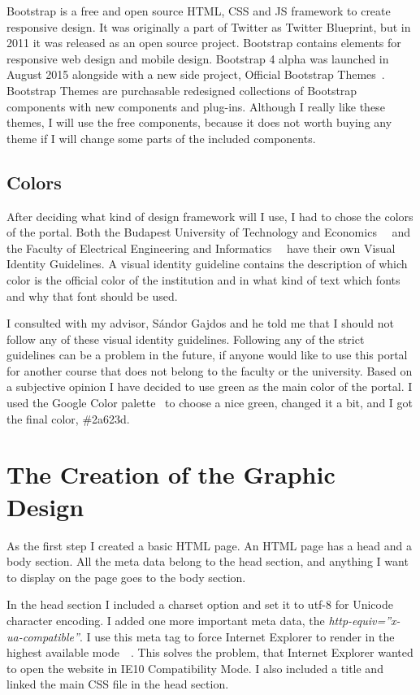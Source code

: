 Bootstrap is a free and open source HTML, CSS and JS framework to create responsive design. It was originally a part of Twitter as Twitter Blueprint, but in 2011 it was released as an open source project. Bootstrap contains elements for responsive web design and mobile design. Bootstrap 4 alpha was launched in August 2015 alongside with a new side project, Official Bootstrap Themes~\cite{Bootstrap-themes}. Bootstrap Themes are purchasable redesigned collections of Bootstrap components with new components and plug-ins. Although I really like these themes, I will use the free components, because it does not worth buying any theme if I will change some parts of the included components. 

\subsection{Colors}

After deciding what kind of design framework will I use, I had to chose the colors of the portal. Both the Budapest University of Technology and Economics~\cite{BME-Arculat}~\cite{BME-Arculat-Intranet} and the Faculty of Electrical Engineering and Informatics~\cite{VIK-Arculat}~\cite{VIK-Arculat-PDF} have their own Visual Identity Guidelines. A visual identity guideline contains the description of which color is the official color of the institution and in what kind of text which fonts and why that font should be used.

I consulted with my advisor, Sándor Gajdos and he told me that I should not follow any of these visual identity guidelines. Following any of the strict guidelines can be a problem in the future, if anyone would like to use this portal for another course that does not belong to the faculty or the university. Based on a subjective opinion I have decided to use green as the main color of the portal. I used the Google Color palette~\cite{google-color-chart} to choose a nice green, changed it a bit, and I got the final color, \#2a623d.

\section{The Creation of the Graphic Design}

As the first step I created a basic HTML page. An HTML page has a head and a body section. All the meta data belong to the head section, and anything I want to display on the page goes to the body section. 

In the head section I included a charset option and set it to utf-8 for Unicode character encoding. I added one more important meta data, the \emph{http-equiv=''x-ua-compatible''}. I use this meta tag to force Internet Explorer to render in the highest available mode~\cite{IE10-microsoft}~\cite{IE10-html5-boiler}. This solves the problem, that Internet Explorer wanted to open the website in IE10 Compatibility Mode. I also included a title and linked the main CSS file in the head section.

